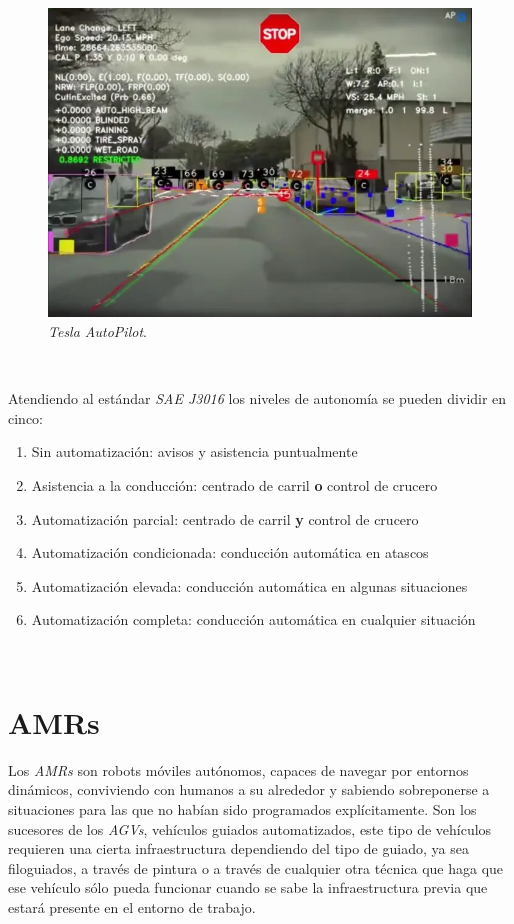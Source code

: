 \begin{figure} [h!]
	\begin{center}
		\includegraphics[width=12cm]{figs/teslaobjectdetection}
	\end{center}
	\caption{\textit{Tesla AutoPilot}.}
	\label{fig:teslaobjectdetection}
\end{figure}\

Atendiendo al estándar \textit{SAE J3016} los niveles de autonomía se pueden dividir en cinco:

\begin{enumerate}
	\item Sin automatización: avisos y asistencia puntualmente
	\item Asistencia a la conducción: centrado de carril \textbf{o} control de crucero
	\item Automatización parcial: centrado de carril \textbf{y} control de crucero
	\item Automatización condicionada: conducción automática en atascos
	\item Automatización elevada: conducción automática en algunas situaciones
	\item Automatización completa: conducción automática en cualquier situación
\end{enumerate}\
\cite{saej3016}

\section{AMRs}
\label{sec:amr}
Los  \textit{AMRs} son robots móviles autónomos, capaces de navegar por entornos dinámicos, conviviendo con humanos a su alrededor y sabiendo sobreponerse a situaciones para las que no habían sido programados explícitamente. Son los sucesores de los  \textit{AGVs}, vehículos guiados automatizados, este tipo de vehículos requieren una cierta infraestructura dependiendo del tipo de guiado, ya sea filoguiados, a través de pintura o a través de cualquier otra técnica que haga que ese vehículo sólo pueda funcionar cuando se sabe la infraestructura previa que estará presente en el entorno de trabajo.\\

